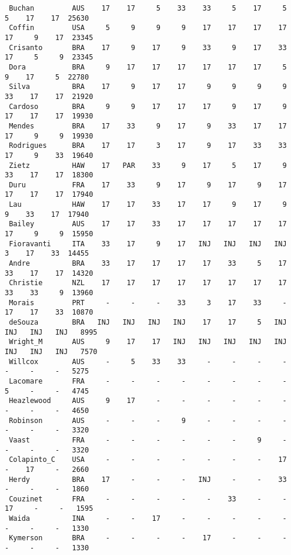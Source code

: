 \documentclass[12pt]{article}
\begin{document}
{\begin{verbatim}
 Buchan         AUS    17    17     5    33    33     5    17     5     5    17    17  25630
 Coffin         USA     5     9     9     9    17    17    17    17    17     9    17  23345
 Crisanto       BRA    17     9    17     9    33     9    17    33    17     5     9  23345
 Dora           BRA     9    17    17    17    17    17    17     5     9    17     5  22780
 Silva          BRA    17     9    17    17     9     9     9     9    33    17    17  21920
 Cardoso        BRA     9     9    17    17    17     9    17     9    17    17    17  19930
 Mendes         BRA    17    33     9    17     9    33    17    17    17     9     9  19930
 Rodrigues      BRA    17    17     3    17     9    17    33    33    17     9    33  19640
 Zietz          HAW    17   PAR    33     9    17     5    17     9    33    17    17  18300
 Duru           FRA    17    33     9    17     9    17     9    17    17    17    17  17940
 Lau            HAW    17    17    33    17    17     9    17     9     9    33    17  17940
 Bailey         AUS    17    17    33    17    17    17    17    17    17     9     9  15950
 Fioravanti     ITA    33    17     9    17   INJ   INJ   INJ   INJ     3    17    33  14455
 Andre          BRA    33    17    17    17    17    33     5    17    33    17    17  14320
 Christie       NZL    17    17    17    17    17    17    17    17    33    33     9  13960
 Morais         PRT     -     -     -    33     3    17    33     -    17    17    33  10870
 deSouza        BRA   INJ   INJ   INJ   INJ    17    17     5   INJ   INJ   INJ   INJ   8995
 Wright_M       AUS     9    17    17   INJ   INJ   INJ   INJ   INJ   INJ   INJ   INJ   7570
 Willcox        AUS     -     5    33    33     -     -     -     -     -     -     -   5275
 Lacomare       FRA     -     -     -     -     -     -     -     -     5     -     -   4745
 Heazlewood     AUS     9    17     -     -     -     -     -     -     -     -     -   4650
 Robinson       AUS     -     -     -     9     -     -     -     -     -     -     -   3320
 Vaast          FRA     -     -     -     -     -     -     9     -     -     -     -   3320
 Colapinto_C    USA     -     -     -     -     -     -     -    17     -    17     -   2660
 Herdy          BRA    17     -     -     -   INJ     -     -    33     -     -     -   1860
 Couzinet       FRA     -     -     -     -     -    33     -     -    17     -     -   1595
 Waida          INA     -     -    17     -     -     -     -     -     -     -     -   1330
 Kymerson       BRA     -     -     -     -    17     -     -     -     -     -     -   1330

\end{verbatim}}
\end{document}
